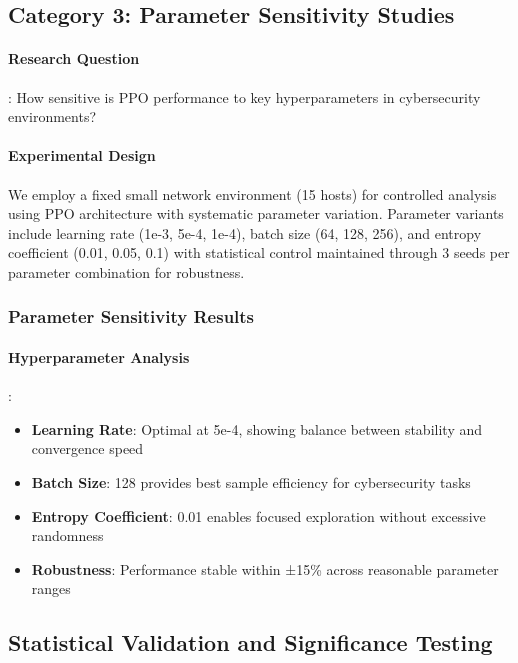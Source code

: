 \documentclass[12pt,oneside]{article}
\begin{document}
\subsection{Category 3: Parameter Sensitivity Studies}

\paragraph{Research Question}: How sensitive is PPO performance to key hyperparameters in cybersecurity environments?

\paragraph{Experimental Design} We employ a fixed small network environment (15 hosts) for controlled analysis using PPO architecture with systematic parameter variation. Parameter variants include learning rate (1e-3, 5e-4, 1e-4), batch size (64, 128, 256), and entropy coefficient (0.01, 0.05, 0.1) with statistical control maintained through 3 seeds per parameter combination for robustness.

\subsubsection{Parameter Sensitivity Results}

\paragraph{Hyperparameter Analysis}:
\begin{itemize}
\item \textbf{Learning Rate}: Optimal at 5e-4, showing balance between stability and convergence speed
\item \textbf{Batch Size}: 128 provides best sample efficiency for cybersecurity tasks
\item \textbf{Entropy Coefficient}: 0.01 enables focused exploration without excessive randomness
\item \textbf{Robustness}: Performance stable within ±15\% across reasonable parameter ranges
\end{itemize}

\subsection{Statistical Validation and Significance Testing}
\end{document}
